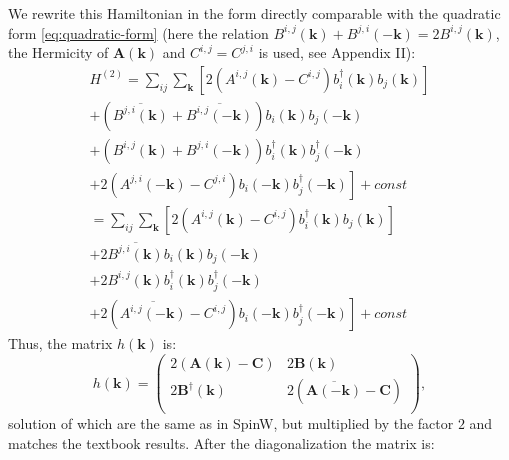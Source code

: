 \documentclass[a4paper,12pt]{article}
\begin{document}
            We rewrite this Hamiltonian in the form directly comparable with the quadratic form \eqref{eq:quadratic-form} 
            (here the relation $B^{i,j}(\boldsymbol{k}) + B^{j,i}(-\boldsymbol{k}) = 2B^{i,j}(\boldsymbol{k})$, 
            the Hermicity of $\boldsymbol{A}(\boldsymbol{k})$ and $C^{i,j} = C^{j,i}$ is used, see Appendix II):
            \begin{multline}
                H^{(2)} = \sum_{ij}\sum_{\boldsymbol{k}}\left[2(A^{i,j}(\boldsymbol{k}) - C^{i,j})b^{\dag}_{i}(\boldsymbol{k})b_{j}(\boldsymbol{k})\right] \\
                +(\overline{B^{j,i}(\boldsymbol{k})} + \overline{B^{i,j}(-\boldsymbol{k})})b_i(\boldsymbol{k})b_{j}(-\boldsymbol{k}) \\
                +(B^{i,j}(\boldsymbol{k}) + B^{j,i}(-\boldsymbol{k}))b^{\dag}_{i}(\boldsymbol{k})b^{\dag}_{j}(-\boldsymbol{k})\\
                +\left.2(A^{j,i}(-\boldsymbol{k}) - C^{j,i})b_{i}(-\boldsymbol{k})b^{\dag}_{j}(-\boldsymbol{k})\right] + const\\
                = \sum_{ij}\sum_{\boldsymbol{k}}\left[2(A^{i,j}(\boldsymbol{k}) - C^{i,j})b^{\dag}_{i}(\boldsymbol{k})b_{j}(\boldsymbol{k})\right] \\
                +2\overline{B^{j,i}(\boldsymbol{k})}b_i(\boldsymbol{k})b_{j}(-\boldsymbol{k}) \\
                +2B^{i,j}(\boldsymbol{k})b^{\dag}_{i}(\boldsymbol{k})b^{\dag}_{j}(-\boldsymbol{k})\\
                +\left.2(\overline{A^{i,j}(-\boldsymbol{k})} - C^{i,j})b_{i}(-\boldsymbol{k})b^{\dag}_{j}(-\boldsymbol{k})\right] + const
            \end{multline}
            Thus, the matrix $h(\boldsymbol{k})$ is:
            \begin{equation}
                h(\boldsymbol{k}) = 
                \begin{pmatrix}
                    2(\boldsymbol{A}(\boldsymbol{k}) - \boldsymbol{C}) & 2\boldsymbol{B}(\boldsymbol{k}) \\
                    2\boldsymbol{B}^{\dag}(\boldsymbol{k}) & 2(\overline{\boldsymbol{A}(-\boldsymbol{k})} - \boldsymbol{C}) \\
                \end{pmatrix},\label{eq:matrix-colpa}
            \end{equation}
            solution of which are the same as in SpinW, but multiplied by the factor $2$ and matches the textbook results. After the diagonalization the matrix is:
\end{document}
